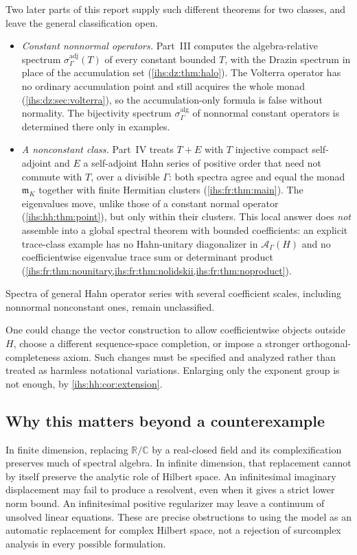 \documentclass[11pt,a4paper]{article}
\numberwithin{equation}{section}
\theoremstyle{definition}
\theoremstyle{remark}
\newcommand{\C}{\mathbb C}
\newcommand{\R}{\mathbb R}
\newcommand{\mK}{\mathfrak m_K}
\newcommand{\Ahh}{\mathcal A_\Gamma(H)}
\begin{document}
Two later parts of this report supply such different theorems for two
classes, and leave the general classification open.
\begin{itemize}
\item \emph{Constant nonnormal operators.} Part~III computes the
 algebra-relative spectrum $\sigma^{\mathrm{adj}}_\Gamma(T)$ of every
 constant bounded $T$, with the Drazin spectrum in place of the accumulation
 set (\cref{ihs:dz:thm:halo}). The Volterra operator has no ordinary
 accumulation point and still acquires the whole monad
 (\cref{ihs:dz:sec:volterra}), so the accumulation-only formula is false
 without normality. The bijectivity spectrum $\sigma^{\mathrm{alg}}_\Gamma$
 of nonnormal constant operators is determined there only in examples.
\item \emph{A nonconstant class.} Part~IV treats $T+E$ with $T$ injective
 compact self-adjoint and $E$ a self-adjoint Hahn series of positive order
 that need not commute with $T$, over a divisible $\Gamma$: both spectra
 agree and equal the monad $\mK$ together with finite Hermitian clusters
 (\cref{ihs:fr:thm:main}). The eigenvalues move, unlike those of a constant
 normal operator (\cref{ihs:hh:thm:point}), but only within their clusters.
 This local answer does \emph{not} assemble into a global spectral theorem
 with bounded coefficients: an explicit trace-class example has no
 Hahn-unitary diagonalizer in $\Ahh$ and no coefficientwise eigenvalue
 trace sum or determinant product
 (\cref{ihs:fr:thm:nounitary,ihs:fr:thm:nolidskii,ihs:fr:thm:noproduct}).
\end{itemize}
Spectra of general Hahn operator series with several coefficient scales,
including nonnormal nonconstant ones, remain unclassified.

One could change the vector construction to allow coefficientwise objects
outside $H$, choose a different sequence-space completion, or impose a
stronger orthogonal-completeness axiom. Such changes must be specified and
analyzed rather than treated as harmless notational variations. Enlarging
only the exponent group is not enough, by \cref{ihs:hh:cor:extension}.

\subsection{Why this matters beyond a counterexample}\label{ihs:hh:sec:beyond}
In finite dimension, replacing $\R/\C$ by a real-closed field and its
complexification preserves much of spectral algebra. In infinite dimension,
that replacement cannot by itself preserve the analytic role of Hilbert
space. An infinitesimal imaginary displacement may fail to produce a
resolvent, even when it gives a strict lower norm bound. An infinitesimal
positive regularizer may leave a continuum of unsolved linear equations.
These are precise obstructions to using the model as an automatic
replacement for complex Hilbert space, not a rejection of surcomplex
analysis in every possible formulation.
\end{document}
